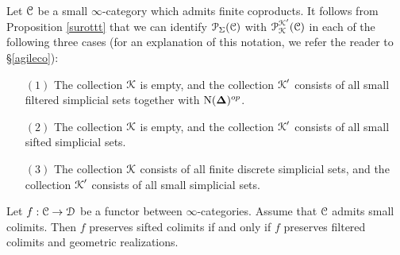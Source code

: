\begin{remark}\label{spuduse}
Let $\operatorname{\mathcal{C}}$ be a small $\infty$-category which admits finite coproducts. It follows from
Proposition \ref{surottt} that we can identify $\operatorname{\mathcal{P}}_{\Sigma}(\operatorname{\mathcal{C}})$ with
$\operatorname{\mathcal{P}}_{\operatorname{\mathcal{K}}}^{\operatorname{\mathcal{K}}'}(\operatorname{\mathcal{C}})$ in each of the following three cases (for
an explanation of this notation, we refer the reader to \S \ref{agileco}):
\begin{itemize}
\item[$(1)$] The collection $\operatorname{\mathcal{K}}$ is empty, and the collection $\operatorname{\mathcal{K}}'$ consists of all
small filtered simplicial sets together with $\operatorname{N}(\operatorname{{\bf \Delta}})^{op}$.
\item[$(2)$] The collection $\operatorname{\mathcal{K}}$ is empty, and the collection $\operatorname{\mathcal{K}}'$ consists of all
small sifted simplicial sets.
\item[$(3)$] The collection $\operatorname{\mathcal{K}}$ consists of all finite discrete simplicial sets, and
the collection $\operatorname{\mathcal{K}}'$ consists of all small simplicial sets.
\end{itemize}
\end{remark}

\begin{corollary}\label{swillt}
Let $f: \operatorname{\mathcal{C}} \rightarrow \operatorname{\mathcal{D}}$ be a functor between $\infty$-categories. Assume that $\operatorname{\mathcal{C}}$ admits small colimits. Then $f$ preserves sifted colimits if and only if $f$ preserves filtered colimits and geometric realizations.
\end{corollary}


